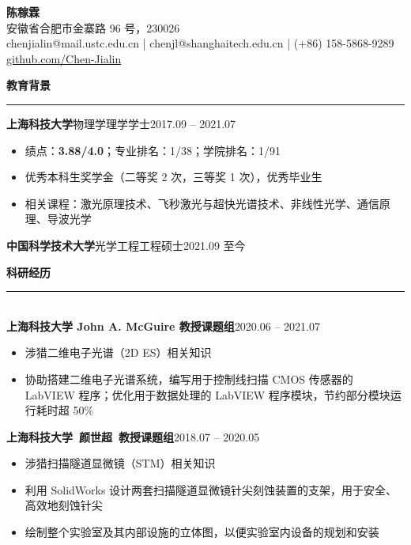 \documentclass[letterpaper,11pt]{article}
\begin{document}
\begin{center}
    {\LARGE\bfseries{}陈稼霖}\\
    \vspace{1ex}
    安徽省合肥市金寨路 96 号，230026\\
    chenjialin@mail.ustc.edu.cn | chenjl@shanghaitech.edu.cn | (+86) 158-5868-9289\\
    \href{https://github.com/Chen-Jialin}{github.com/Chen-Jialin}\\
\end{center}

{\Large\bfseries{}教育背景}\\
\rule[1.5ex]{\textwidth}{1pt}
{\songti\large\bfseries{}上海科技大学}{\large\quad{}物理学\quad{}理学学士}\hfill{2017.09 -- 2021.07}\\
\vspace{-4ex}
\begin{itemize}
    \item 绩点：{\bfseries{}3.88/4.0}；专业排名：1/38；学院排名：1/91
    \item 优秀本科生奖学金（二等奖 2 次，三等奖 1 次），优秀毕业生
    \item 相关课程：激光原理技术、飞秒激光与超快光谱技术、非线性光学、通信原理、导波光学
\end{itemize}
{\songti\large\bfseries{}中国科学技术大学}{\large\quad{}光学工程\quad{}工程硕士}\hfill{2021.09 至今}\\
\vspace{-1ex}%

{\Large\bfseries{}科研经历}\\
\rule[1.5ex]{\columnwidth}{1pt}\\
{\songti\large\bfseries{}上海科技大学 John A. McGuire 教授课题组}\hfill{2020.06 -- 2021.07}\\
\vspace{-4ex}
\begin{itemize}
    \item 涉猎二维电子光谱（2D ES）相关知识
    \item 协助搭建二维电子光谱系统，编写用于控制线扫描 CMOS 传感器的 LabVIEW 程序；优化用于数据处理的 LabVIEW 程序模块，节约部分模块运行耗时超 50\%
\end{itemize}
{\songti\large\bfseries{}上海科技大学~颜世超~教授课题组}\hfill{2018.07 -- 2020.05}\\
\vspace{-4ex}
\begin{itemize}
    \item 涉猎扫描隧道显微镜（STM）相关知识
    \item 利用 SolidWorks 设计两套扫描隧道显微镜针尖刻蚀装置的支架，用于安全、高效地刻蚀针尖
    \item 绘制整个实验室及其内部设施的立体图，以便实验室内设备的规划和安装
\end{itemize}
\vspace{1ex}
\end{document}
